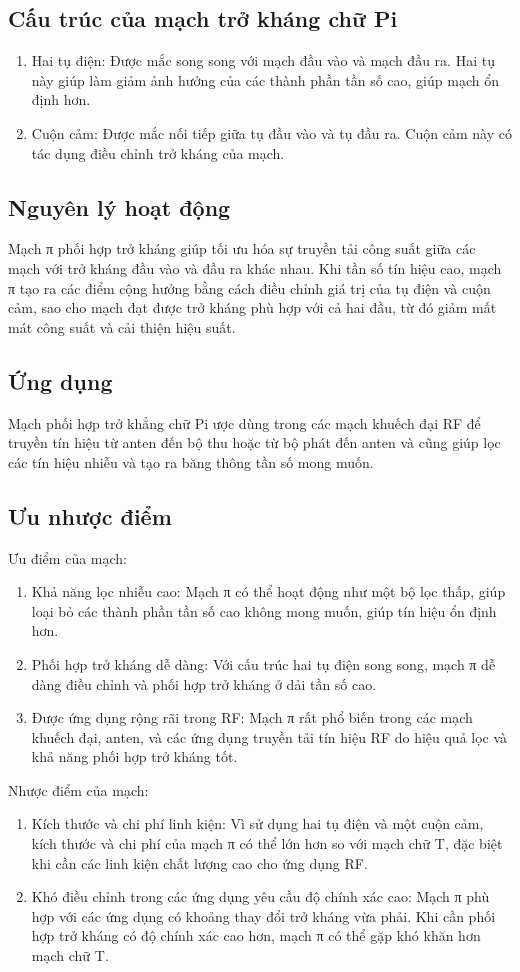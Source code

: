 \documentclass{article}
\begin{document}
\subsection{Cấu trúc của mạch trở kháng chữ Pi}
\begin{enumerate}
    \item Hai tụ điện: Được mắc song song với mạch đầu vào và mạch đầu ra. Hai tụ này giúp làm giảm ảnh hưởng của các thành phần tần số cao, giúp mạch ổn định hơn.
    \item Cuộn cảm: Được mắc nối tiếp giữa tụ đầu vào và tụ đầu ra. Cuộn cảm này có tác dụng điều chỉnh trở kháng của mạch.
\end{enumerate}
\subsection{Nguyên lý hoạt động }
Mạch π phối hợp trở kháng giúp tối ưu hóa sự truyền tải công suất giữa các mạch với trở kháng đầu vào và đầu ra khác nhau. Khi tần số tín hiệu cao, mạch π tạo ra các điểm cộng hưởng bằng cách điều chỉnh giá trị của tụ điện và cuộn cảm, sao cho mạch đạt được trở kháng phù hợp với cả hai đầu, từ đó giảm mất mát công suất và cải thiện hiệu suất.
\subsection{Ứng dụng }
Mạch phối hợp trở khẳng chữ Pi ược dùng trong các mạch khuếch đại RF để truyền tín hiệu từ anten đến bộ thu hoặc từ bộ phát đến anten và cũng giúp lọc các tín hiệu nhiễu và tạo ra băng thông tần số mong muốn.
\subsection{Ưu nhược điểm }
Ưu điểm của mạch:
\begin{enumerate}
    \item Khả năng lọc nhiễu cao: Mạch π có thể hoạt động như một bộ lọc thấp, giúp loại bỏ các thành phần tần số cao không mong muốn, giúp tín hiệu ổn định hơn.
    \item Phối hợp trở kháng dễ dàng: Với cấu trúc hai tụ điện song song, mạch π dễ dàng điều chỉnh và phối hợp trở kháng ở dải tần số cao.
    \item Được ứng dụng rộng rãi trong RF: Mạch π rất phổ biến trong các mạch khuếch đại, anten, và các ứng dụng truyền tải tín hiệu RF do hiệu quả lọc và khả năng phối hợp trở kháng tốt.
\end{enumerate}

Nhược điểm của mạch:
\begin{enumerate}
    \item Kích thước và chi phí linh kiện: Vì sử dụng hai tụ điện và một cuộn cảm, kích thước và chi phí của mạch π có thể lớn hơn so với mạch chữ T, đặc biệt khi cần các linh kiện chất lượng cao cho ứng dụng RF.
    \item Khó điều chỉnh trong các ứng dụng yêu cầu độ chính xác cao: Mạch π phù hợp với các ứng dụng có khoảng thay đổi trở kháng vừa phải. Khi cần phối hợp trở kháng có độ chính xác cao hơn, mạch π có thể gặp khó khăn hơn mạch chữ T.
\end{enumerate}
\end{document}
